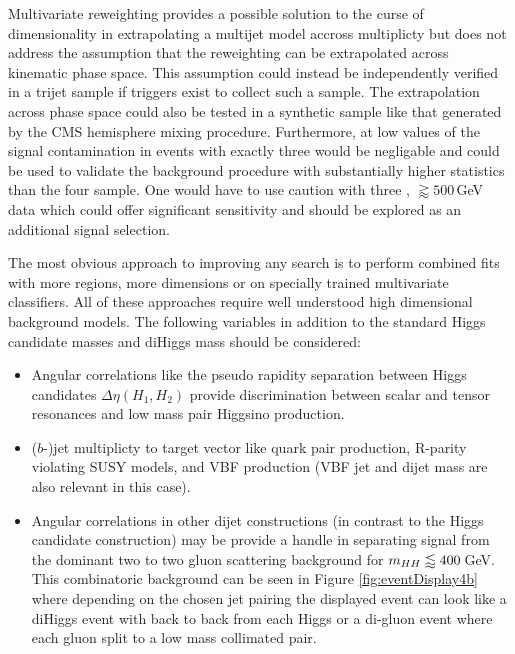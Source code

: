 Multivariate reweighting provides a possible solution to the curse of dimensionality in extrapolating a multijet model accross \bjet multiplicty but
does not address the assumption that the reweighting can be extrapolated across kinematic phase space.
This assumption could instead be independently verified in a trijet sample if triggers exist to collect such a sample.
The extrapolation across phase space could also be tested in a synthetic sample like that generated by the CMS hemisphere mixing procedure.
Furthermore, at low values of \mhh the signal contamination in events with exactly three \bjets would be negligable and could be used to validate the background procedure with substantially higher statistics than the four \bjet sample.
One would have to use caution with three \bjet, \mhh$\gtrapprox 500\,$GeV data which could offer significant sensitivity and should be explored as an additional signal selection.

The most obvious approach to improving any search is to perform combined fits with more regions, more dimensions or on specially trained multivariate classifiers.
All of these approaches require well understood high dimensional background models.
The following variables in addition to the standard Higgs candidate masses and diHiggs mass \mhh should be considered:
\begin{itemize}
\item Angular correlations like the pseudo rapidity separation between Higgs candidates $\Delta\eta(H_1,H_2)$ provide discrimination between scalar and tensor resonances and low mass pair Higgsino production.
\item ($b$-)jet multiplicty to target vector like quark pair production, R-parity violating SUSY models, and VBF \hh production (VBF jet \eta and dijet mass are also relevant in this case).
\item Angular correlations in other dijet constructions (in contrast to the Higgs candidate construction) may be provide a handle in separating signal
  from the dominant two to two gluon scattering background for $m_{HH}\lessapprox 400\,$GeV.
  This combinatoric background can be seen in Figure \ref{fig:eventDisplay4b} where depending on the chosen jet pairing
  the displayed event can look like a diHiggs event with back to back \bjets from each Higgs or a di-gluon event where each gluon split to a low mass collimated \bb pair. 
\end{itemize}

